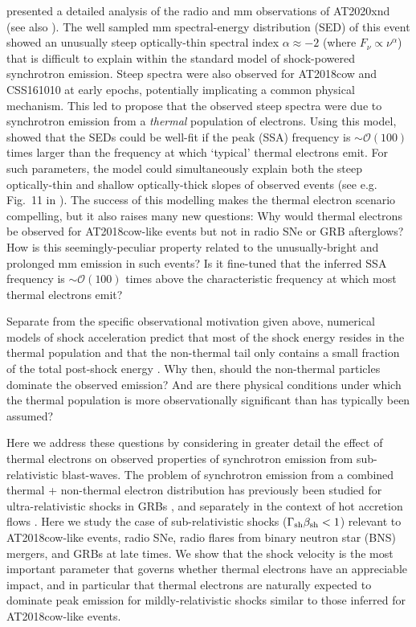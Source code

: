 \documentclass[twocolumn]{aastex63}
\begin{document}
\cite{Ho+21b} presented a detailed analysis of the radio and mm observations of AT2020xnd (see also \citealt{Bright+21}). The well sampled mm spectral-energy distribution (SED) of this event showed an unusually steep optically-thin spectral index $\alpha \approx -2$ (where $F_\nu \propto \nu^{\alpha}$) that is difficult to explain within the standard model of shock-powered synchrotron emission. Steep spectra were also observed for AT2018cow and CSS161010 at early epochs, potentially implicating a common physical mechanism.
This led \cite{Ho+21b} to propose that the observed steep spectra were due to synchrotron emission from a {\it thermal} population of electrons.
Using this model, \cite{Ho+21b} showed that the SEDs could be well-fit
if the peak (SSA) frequency is $\sim\mathcal{O}(100)$ times larger than the frequency 
at which `typical' thermal electrons emit.
For such parameters, the model could simultaneously explain both the steep optically-thin and shallow optically-thick slopes of observed events (see e.g. Fig.~11 in \citealt{Ho+21b}).
The success of this modelling makes the thermal electron scenario compelling, but it also raises many new questions:
Why would thermal electrons be observed for AT2018cow-like events but not in radio SNe or GRB afterglows?
How is this seemingly-peculiar property related to the unusually-bright and prolonged mm emission in such events?
Is it fine-tuned that the inferred SSA frequency is $\sim\mathcal{O}(100)$ times above the characteristic frequency at which most thermal electrons emit?

Separate from the specific observational motivation given above, numerical models of shock acceleration predict that most of the shock energy resides in the thermal population and that the non-thermal tail only contains a small fraction of the total post-shock energy \citep[e.g.][]{Park+15,Crumley+19}. Why then, should the non-thermal particles dominate the observed emission?   And are there physical conditions under which the thermal population is more observationally significant than has typically been assumed?

Here we address these questions by considering in greater detail the effect of thermal electrons on observed properties of synchrotron emission from sub-relativistic blast-waves.
The problem of synchrotron emission from a combined thermal + non-thermal electron distribution has previously been studied for ultra-relativistic shocks in GRBs \citep{Eichler&Waxman05,Giannios&Spitkovsky09,Ressler&Laskar17,Warren+18}, and separately in the context of hot accretion flows \citep[e.g.][]{Ozel+00}.
Here we study the case of sub-relativistic shocks ($\Gamma_{\rm sh} \beta_{\rm sh} < 1$) relevant to AT2018cow-like events, radio SNe, radio flares from binary neutron star (BNS) mergers, and GRBs at late times. We show that the shock velocity is the most important parameter that governs whether thermal electrons have an appreciable impact, and in particular that thermal electrons are naturally expected to dominate peak emission for mildly-relativistic shocks similar to those inferred for AT2018cow-like events.
\end{document}
